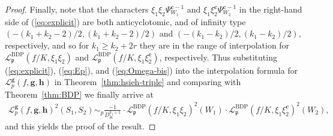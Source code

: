 \documentclass[10pt,letterpaper]{amsart}
\theoremstyle{plain}
\theoremstyle{definition}
\theoremstyle{definition}
\theoremstyle{plain}
\theoremstyle{plain}
\theoremstyle{plain}
\newtheorem{cor}[thm]{Corollary}
\theoremstyle{remark}
\numberwithin{equation}{section}
\newcommand{\cc}{\mathbf{c}}
\newcommand{\ch}{\xi}
\newcommand{\pp}{\mathfrak{p}}
\DeclareMathOperator{\BDP}{BDP} %
\def\cO{\mathcal O}
\def\x{{\times}}
\def\al{\alpha}
\newcommand{\dBr}[1]{\llbracket{#1}\rrbracket}
\newcommand{\bfg}{{\boldsymbol{g}}}
\newcommand{\bfh}{{\boldsymbol{h}}}
\begin{document}
\begin{proof}
Finally, note that the characters $\ch_1\ch_2\Psi_{W_1}^{\cc-1}$ and $\ch_1\ch_2^\cc\Psi_{W_2}^{\cc-1}$ in the right-hand side of (\ref{eq:explicit}) are both  anticyclotomic, and of infinity type $(-(k_1+k_2-2)/2,(k_1+k_2-2)/2)$ and $(-(k_1-k_2)/2,(k_1-k_2)/2)$, respectively, and so for $k_1\geq k_2+2r$ they are in the range of interpolation for $\mathscr{L}_\pp^{\BDP}(f/K,\ch_1\ch_2)$ and $\mathscr{L}_\pp^{\BDP}(f/K,\ch_1\ch_2^\cc)$, respectively. Thus substituting (\ref{eq:explicit}), (\ref{eq:Ep}), and (\ref{eq:Omega-bis}) into the interpolation formula for $\mathscr{L}_p^\bfg(f,\bfg,\bfh)$ in Theorem~\ref{thm:hsieh-triple} and comparing with Theorem~\ref{thm:BDP} we finally arrive at
\begin{align*}
\mathscr{L}_p^{\bfg}(f,\bfg,\bfh)^2(S_1,S_2)
\sim_p\frac{-1}{D_K^{k_1+1}}\cdot\mathscr{L}_\pp^{\BDP}(f/K,\ch_1\ch_2)^2(W_1)\cdot\mathscr{L}_\pp^{\BDP}(f/K,\ch_1\ch_2^\cc)^2(W_2),
\end{align*}
and this yields the proof of the result.
\end{proof}




\end{document}

